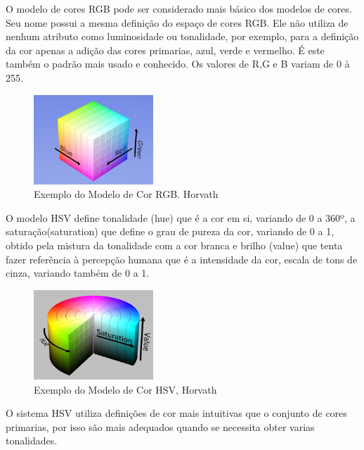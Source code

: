 O modelo de cores RGB pode ser considerado mais básico dos modelos de cores. Seu nome possui a mesma definição do espaço de cores RGB. Ele não utiliza de nenhum atributo como luminosidade ou tonalidade, por exemplo, para a definição da cor apenas a adição das cores primarias, azul, verde e vermelho. É este também o padrão mais usado e conhecido. Os valores de R,G e B variam de 0 à 255.


\begin{figure}[!h]
	\centering
	\includegraphics[width=0.4\textwidth]{rgb.pdf}
	
\caption{Exemplo do Modelo de Cor RGB.	 Horvath\cite{ImagensHSLHSVRGB}  }
	\label{ModeloRGB}
\end{figure}



O modelo HSV define tonalidade (hue) que é a cor em si, variando de 0 a 360º, a saturação(saturation) que define o grau de pureza da cor, variando de 0 a 1, obtido pela mistura da tonalidade com a cor branca e brilho (value) que tenta fazer referência à percepção humana\cite{Leao:2005} que é a intensidade da cor, escala de tons de cinza\cite{Azevedo:2003}, variando também de 0 a 1.


\begin{figure}[!h]
	\centering
	\includegraphics[width=0.4\textwidth]{hsv.pdf}
	
	\caption{Exemplo do Modelo de Cor HSV, Horvath\cite{ImagensHSLHSVRGB}}
	\label{ModeloHSV}
\end{figure} 


O sistema HSV utiliza definições de cor mais intuitivas que o conjunto de cores primarias, por isso são mais adequados quando se necessita obter varias tonalidades.

